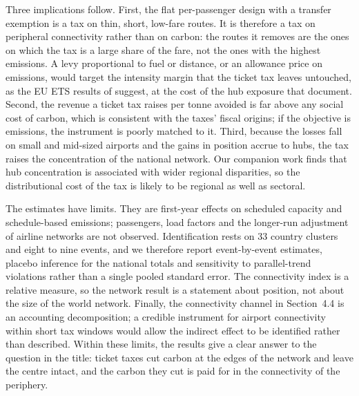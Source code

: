 Three implications follow. First, the flat per-passenger design with a transfer exemption is a tax on
thin, short, low-fare routes. It is therefore a tax on peripheral connectivity rather than on carbon:
the routes it removes are the ones on which the tax is a large share of the fare, not the ones with
the highest emissions. A levy proportional to fuel or distance, or an allowance price on emissions,
would target the intensity margin that the ticket tax leaves untouched, as the EU ETS results of
\citet{fageda2022pricing} suggest, at the cost of the hub exposure that \citet{fageda2025hub}
document. Second, the revenue a ticket tax raises per tonne avoided is far above any social cost of
carbon, which is consistent with the taxes' fiscal origins; if the objective is emissions, the
instrument is poorly matched to it. Third, because the losses fall on small and mid-sized airports and
the gains in position accrue to hubs, the tax raises the concentration of the national network. Our
companion work finds that hub concentration is associated with wider regional disparities, so the
distributional cost of the tax is likely to be regional as well as sectoral.

The estimates have limits. They are first-year effects on scheduled capacity and schedule-based
emissions; passengers, load factors and the longer-run adjustment of airline networks are not observed.
Identification rests on 33 country clusters and eight to nine events, and we therefore report event-by-event estimates, placebo inference for the national totals and sensitivity to parallel-trend violations rather than a single pooled standard error. The connectivity index is a relative measure, so the network result is a statement about position, not about the size of the world network. Finally, the
connectivity channel in Section~4.4 is an accounting decomposition; a credible instrument for airport
connectivity within short tax windows would allow the indirect effect to be identified rather than
described. Within these limits, the results give a clear answer to the question in the title: ticket
taxes cut carbon at the edges of the network and leave the centre intact, and the carbon they cut is
paid for in the connectivity of the periphery.
